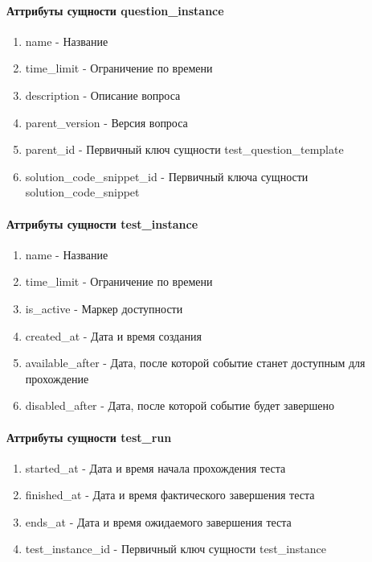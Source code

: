 \documentclass{article}
\begin{document}
\paragraph{Аттрибуты сущности question\_instance}
\begin{enumerate}
	\item name - Название
	\item time\_limit - Ограничение по времени
	\item description - Описание вопроса
	\item parent\_version - Версия вопроса
	\item parent\_id - Первичный ключ сущности
	test\_question\_template
	\item solution\_code\_snippet\_id - Первичный ключа
	сущности solution\_code\_snippet  
\end{enumerate}

\paragraph{Аттрибуты сущности test\_instance}
\begin{enumerate}
	\item name - Название
	\item time\_limit - Ограничение по времени
	\item is\_active - Маркер доступности
	\item created\_at - Дата и время создания
	\item available\_after - Дата, после которой событие
	станет доступным для прохождение
	\item disabled\_after - Дата, после которой событие
	будет завершено
\end{enumerate}

\paragraph{Аттрибуты сущности test\_run}
\begin{enumerate}
	\item started\_at - Дата и время начала прохождения теста
	\item finished\_at - Дата и время фактического завершения теста
	\item ends\_at - Дата и время ожидаемого завершения теста
	\item test\_instance\_id - Первичный ключ сущности test\_instance
\end{enumerate}
\end{document}
